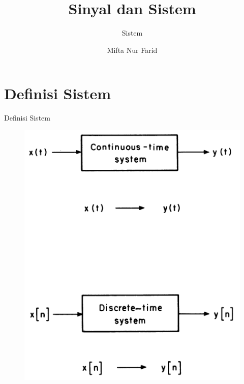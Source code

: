 \documentclass[pdflatex,compress,mathserif]{beamer}
\title{Sinyal dan Sistem}
\subtitle{Sistem}
\author{Mifta Nur Farid}
\begin{document}
\maketitle

\section{Definisi Sistem}
\begin{frame}{Definisi Sistem}
	\begin{figure}
		\centering
		\includegraphics[height=0.8\textheight]{img/02.slide_09}
	\end{figure}
\end{frame}
\end{document}
